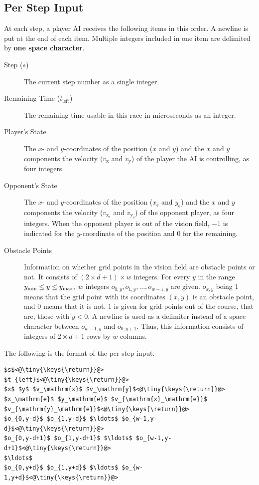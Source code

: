 \documentclass[11pt]{article}
\begin{document}
\subsection{Per Step Input}
At each step, a player AI receives the following items in this order.
A newline is put at the end of each item. Multiple integers included in one item are delimited by {\bf one space character}.
\begin{description}
\item[Step ($s$)] The current step number as a single integer.
\item[Remaining Time ($t_\mathrm{left}$)] The remaining time usable in this race in
  microseconds as an integer.
\item[Player's State] The $x$- and $y$-coordinates of the position ($x$ and $y$) and
  the $x$ and $y$ components the velocity $(v_\mathrm{x}$ and $v_\mathrm{y}$) of the player the AI is
  controlling, as four integers.
\item[Opponent's State] The $x$- and $y$-coordinates of the position ($x_\mathrm{e}$ and $y_\mathrm{e}$) and
  the $x$ and $y$ components the velocity ($v_{\mathrm{x}_\mathrm{e}}$ and $v_{\mathrm{y}_\mathrm{e}}$) of the opponent player, as
  four integers.  When the opponent player is out of the vision field,
  $-1$ is indicated for the $y$-coordinate of the position and $0$ for
  the remaining.
\item[Obstacle Points] Information on whether grid points in
  the vision field are obstacle points or not.  It consists of
  $(2\times d+1)\times w$ integers.  For every $y$ in the range
  $y_{\rm min} \le y \le y_{\rm max},$ $w$ integers $o_{0,y}, o_{1,y},
  \ldots, o_{w-1,y}$ are given.  $o_{x,y}$ being $1$ means that the
  grid point with its coordinates $(x,y)$ is an obstacle point, and
  $0$ means that it is not.  $1$ is given for grid points out of the
  course, that are, those with $y<0$.  A newline is used as a
  delimiter instead of a space character between $o_{w-1,y}$ and $o_{0,y+1}$.
  Thus, this information consists of integers of $2 \times d + 1$ rows by $w$ columns.

\end{description}

\noindent
The following is the format of the per step input.

\begin{lstlisting}
$s$<@\tiny{\keys{\return}}@>
$t_{left}$<@\tiny{\keys{\return}}@>
$x$ $y$ $v_\mathrm{x}$ $v_\mathrm{y}$<@\tiny{\keys{\return}}@>
$x_\mathrm{e}$ $y_\mathrm{e}$ $v_{\mathrm{x}_\mathrm{e}}$ $v_{\mathrm{y}_\mathrm{e}}$<@\tiny{\keys{\return}}@>
$o_{0,y-d}$ $o_{1,y-d}$ $\ldots$ $o_{w-1,y-d}$<@\tiny{\keys{\return}}@>
$o_{0,y-d+1}$ $o_{1,y-d+1}$ $\ldots$ $o_{w-1,y-d+1}$<@\tiny{\keys{\return}}@>
$\ldots$
$o_{0,y+d}$ $o_{1,y+d}$ $\ldots$ $o_{w-1,y+d}$<@\tiny{\keys{\return}}@>
\end{lstlisting}
\end{document}

